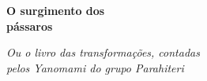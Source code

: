 

\thispagestyle{empty}






\begingroup\thispagestyle{empty}\vspace*{.05\textheight} 

              {\formular
              \huge
              \noindent
              \textbf{O surgimento dos\\ 
              pássaros}\\ 
              
              \vspace{-0.5cm}
              
              }

              \vspace{0.5cm}

              \noindent{}\textit{Ou o livro das transformações, contadas\\pelos Yanomami do  grupo Parahiteri}
                    
\endgroup
\vfill
\pagebreak